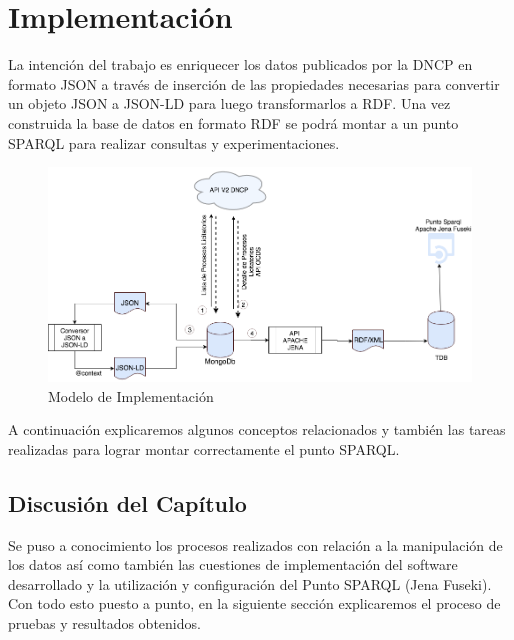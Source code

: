 \chapter{Implementación}
\label{chap:Implementación de la Ontologia}


La intención del trabajo es enriquecer los datos publicados por la DNCP en formato JSON a través de inserción de las propiedades necesarias para convertir un objeto JSON a JSON-LD para luego transformarlos a RDF. Una vez construida la base de datos en formato RDF se podrá montar a un punto SPARQL para realizar consultas y experimentaciones.


\begin{figure}[h!]
   \centering
   \includegraphics[width=150mm]{figuras/Diagramas-Implementacion.png}
   \caption{Modelo de Implementación}
   \label{img:modelo de Implementacion}
\end{figure}

A continuación explicaremos algunos conceptos relacionados y también las tareas realizadas para lograr montar correctamente el punto SPARQL.















 \section{Discusión del Capítulo }

 Se puso a conocimiento los procesos realizados con relación a la manipulación de los datos así como también las cuestiones de implementación del software desarrollado y la utilización y configuración del Punto SPARQL (Jena Fuseki). Con todo esto puesto a punto, en la siguiente sección explicaremos el proceso de pruebas y resultados obtenidos.



